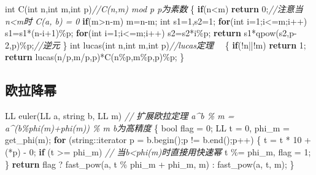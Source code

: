 \documentclass[
]{article}
\newenvironment{Shaded}{}{}
\newcommand{\CharTok}[1]{\textcolor[rgb]{0.25,0.44,0.63}{#1}}
\newcommand{\CommentTok}[1]{\textcolor[rgb]{0.38,0.63,0.69}{\textit{#1}}}
\newcommand{\ControlFlowTok}[1]{\textcolor[rgb]{0.00,0.44,0.13}{\textbf{#1}}}
\newcommand{\DataTypeTok}[1]{\textcolor[rgb]{0.56,0.13,0.00}{#1}}
\newcommand{\DecValTok}[1]{\textcolor[rgb]{0.25,0.63,0.44}{#1}}
\newcommand{\NormalTok}[1]{#1}
\begin{document}
\begin{Shaded}
\begin{Highlighting}[]
\DataTypeTok{int}\NormalTok{ C(}\DataTypeTok{int}\NormalTok{ n,}\DataTypeTok{int}\NormalTok{ m,}\DataTypeTok{int}\NormalTok{ p)}\CommentTok{//C(n,m) mod p p为素数}
\NormalTok{\{}
    \ControlFlowTok{if}\NormalTok{(n\textless{}m) }\ControlFlowTok{return} \DecValTok{0}\NormalTok{;}\CommentTok{//注意当n\textless{}m时 C(a, b) = 0}
    \ControlFlowTok{if}\NormalTok{(m\textgreater{}n{-}m) m=n{-}m;}
    \DataTypeTok{int}\NormalTok{ s1=}\DecValTok{1}\NormalTok{,s2=}\DecValTok{1}\NormalTok{;}
    \ControlFlowTok{for}\NormalTok{(}\DataTypeTok{int}\NormalTok{ i=}\DecValTok{1}\NormalTok{;i\textless{}=m;i++) s1=s1*(n{-}i+}\DecValTok{1}\NormalTok{)\%p;}
    \ControlFlowTok{for}\NormalTok{(}\DataTypeTok{int}\NormalTok{ i=}\DecValTok{1}\NormalTok{;i\textless{}=m;i++) s2=s2*i\%p;}
    \ControlFlowTok{return}\NormalTok{ s1*qpow(s2,p{-}}\DecValTok{2}\NormalTok{,p)\%p;}\CommentTok{//逆元}
\NormalTok{\}}
\DataTypeTok{int}\NormalTok{ lucas(}\DataTypeTok{int}\NormalTok{ n,}\DataTypeTok{int}\NormalTok{ m,}\DataTypeTok{int}\NormalTok{ p)}\CommentTok{//lucas定理　}
\NormalTok{\{}
    \ControlFlowTok{if}\NormalTok{(!n||!m) }\ControlFlowTok{return} \DecValTok{1}\NormalTok{;}
    \ControlFlowTok{return}\NormalTok{ lucas(n/p,m/p,p)*C(n\%p,m\%p,p)\%p;}
\NormalTok{\}}
\end{Highlighting}
\end{Shaded}

\hypertarget{ux6b27ux62c9ux964dux5e42}{%
\subsection{欧拉降幂}\label{ux6b27ux62c9ux964dux5e42}}

\begin{Shaded}
\begin{Highlighting}[]
\NormalTok{LL euler(LL a, string b, LL m) }\CommentTok{// 扩展欧拉定理 a\^{}b \% m = a\^{}(b\%phi(m)+phi(m)) \% m b为高精度}
\NormalTok{\{}
    \DataTypeTok{bool}\NormalTok{ flag = }\DecValTok{0}\NormalTok{;}
\NormalTok{    LL t = }\DecValTok{0}\NormalTok{, phi\_m = get\_phi(m);}
    \ControlFlowTok{for}\NormalTok{ (string::iterator p = b.begin();p != b.end();p++)}
\NormalTok{    \{}
\NormalTok{        t = t * }\DecValTok{10}\NormalTok{ + (*p) {-} }\CharTok{\textquotesingle{}0\textquotesingle{}}\NormalTok{;}
        \ControlFlowTok{if}\NormalTok{ (t \textgreater{}= phi\_m) }\CommentTok{// 当b\textless{}phi(m)时直接用快速幂}
\NormalTok{            t \%= phi\_m, flag = }\DecValTok{1}\NormalTok{;}
\NormalTok{    \}}
    \ControlFlowTok{return}\NormalTok{ flag ? fast\_pow(a, t \% phi\_m + phi\_m, m) : fast\_pow(a, t, m);}
\NormalTok{\}}
\end{Highlighting}
\end{Shaded}
\end{document}
